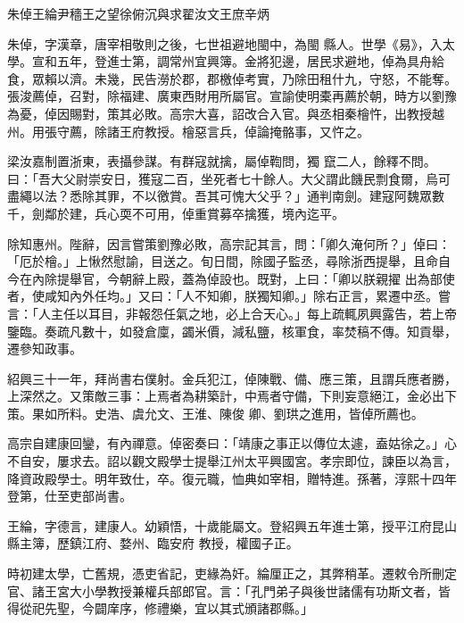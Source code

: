 
\begin{pinyinscope}

 朱倬王綸尹穡王之望徐俯沉與求翟汝文王庶辛炳



 朱倬，字漢章，唐宰相敬則之後，七世祖避地閩中，為閩
 縣人。世學《易》，入太學。宣和五年，登進士第，調常州宜興簿。金將犯邊，居民求避地，倬為具舟給食，眾賴以濟。未幾，民告澇於郡，郡檄倬考實，乃除田租什九，守怒，不能奪。張浚薦倬，召對，除福建、廣東西財用所屬官。宣諭使明橐再薦於朝，時方以劉豫為憂，倬因賜對，策其必敗。高宗大喜，詔改合入官。與丞相秦檜忤，出教授越州。用張守薦，除諸王府教授。檜惡言兵，倬論掩骼事，又忤之。



 梁汝嘉制置浙東，表攝參謀。有群寇就擒，屬倬鞫問，獨
 竄二人，餘釋不問。曰：「吾大父尉崇安日，獲寇二百，坐死者七十餘人。大父謂此饑民剽食爾，烏可盡繩以法？悉除其罪，不以徼賞。吾其可愧大父乎？」通判南劍。建寇阿魏眾數千，劍鄰於建，兵心耎不可用，倬重賞募卒擒獲，境內迄平。



 除知惠州。陛辭，因言嘗策劉豫必敗，高宗記其言，問：「卿久淹何所？」倬曰：「厄於檜。」上愀然慰諭，目送之。旬日間，除國子監丞，尋除浙西提舉，且命自今在內除提舉官，今朝辭上殿，蓋為倬設也。既對，上曰：「卿以朕親擢
 出為部使者，使咸知內外任均。」又曰：「人不知卿，朕獨知卿。」除右正言，累遷中丞。嘗言：「人主任以耳目，非報怨任氣之地，必上合天心。」每上疏輒夙興露告，若上帝鑒臨。奏疏凡數十，如發倉廩，蠲米價，減私鹽，核軍食，率焚稿不傳。知貢舉，遷參知政事。



 紹興三十一年，拜尚書右僕射。金兵犯江，倬陳戰、備、應三策，且謂兵應者勝，上深然之。又策敵三事：上焉者為耕築計，中焉者守備，下則妄意絕江，金必出下策。果如所料。史浩、虞允文、王淮、陳俊
 卿、劉珙之進用，皆倬所薦也。



 高宗自建康回鑾，有內禪意。倬密奏曰：「靖康之事正以傳位太遽，盍姑徐之。」心不自安，屢求去。詔以觀文殿學士提舉江州太平興國宮。孝宗即位，諫臣以為言，降資政殿學士。明年致仕，卒。復元職，恤典如宰相，贈特進。孫著，淳熙十四年登第，仕至吏部尚書。



 王綸，字德言，建康人。幼穎悟，十歲能屬文。登紹興五年進士第，授平江府昆山縣主簿，歷鎮江府、婺州、臨安府
 教授，權國子正。



 時初建太學，亡舊規，憑吏省記，吏緣為奸。綸厘正之，其弊稍革。遷敕令所刪定官、諸王宮大小學教授兼權兵部郎官。言：「孔門弟子與後世諸儒有功斯文者，皆得從祀先聖，今闢庠序，修禮樂，宜以其式頒諸郡縣。」




\end{pinyinscope}
